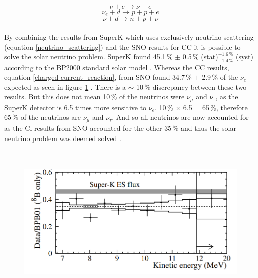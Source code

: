 \begin{equation}
    \nu + e \rightarrow  \nu + e
    \label{neutrino_scattering}
\end{equation}
\begin{equation}
    \nu_e + d \rightarrow p + p + e 
    \label{charged-current_reaction}
\end{equation}
\begin{equation}
    \nu + d \rightarrow  n + p + \nu
    \label{neutral-current_reaction}
\end{equation}
\\By combining the results from SuperK which uses exclusively neutrino scattering (equation \ref{neutrino_scattering}) and the SNO results for CC it is possible to solve the solar neutrino problem. SuperK found 45.1\,\% $\pm$ 0.5\,\% (stat)$^{+1.6\,\%}_{-1.4\,\%}$ (syst) according to the BP2000 standard solar model \cite{superK2001}. Whereas the CC results, equation \ref{charged-current_reaction}, from SNO found 34.7\,\% $\pm$ 2.9\,\% of the $\nu_e$ expected as seen in figure \ref{sno_superK_comparision_plot} \cite{sno2001}. There is a $\sim$ 10\,\% discrepancy between these two results. But this does not mean 10\,\% of the neutrinos were $\nu_\mu$ and $\nu_\tau$, as the SuperK detector is 6.5 times more sensitive to $\nu_e$. 10\,\% $\times$ 6.5 = 65\,\%, therefore 65\,\% of the neutrinos are $\nu_\mu$ and $\nu_\tau$. And so all neutrinos are now accounted for as the Cl results from SNO accounted for the other 35\,\% and thus the solar neutrino problem was deemed solved \cite{griffiths2008book} \cite{griffiths2008neutrinoOscillations}.


\begin{figure}[htbp]
 \centering
 \includegraphics[height=75mm]{Chapter1/Figs/Raster/superKSnoComparison.png} %
 \label{sno_superK_comparision_plot}
\end{figure}


